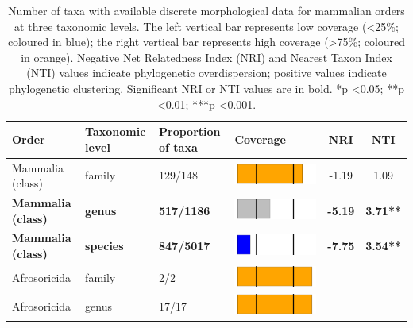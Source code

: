 \begin{longtable}{lL{1.8cm}C{2cm}lcc}
\caption{Number of taxa with available discrete morphological data for mammalian orders at three
taxonomic levels. The left vertical bar represents low coverage (\textless 25\%; coloured in blue); the right vertical bar represents high coverage (\textgreater 75\%; coloured in orange). Negative Net Relatedness Index (NRI) and Nearest Taxon Index (NTI) values indicate phylogenetic overdispersion; positive values indicate phylogenetic clustering. Significant NRI or NTI values are in bold. *p \textless 0.05; **p \textless 0.01; ***p \textless 0.001.
} \\ 

  \hline
Order & Taxonomic level & Proportion of taxa & Coverage & NRI & NTI \\ 
  \hline
  Mammalia (class) & family & 129/148 & \includegraphics[width=0.20\linewidth, height=0.05\linewidth]{Table_figures/bar40.pdf} & -1.19 & 1.09 \\ 
  \textbf{Mammalia (class)} & \textbf{genus} & \textbf{517/1186} & \includegraphics[width=0.20\linewidth, height=0.05\linewidth]{Table_figures/bar41.pdf} & \textbf{-5.19} & \textbf{3.71**} \\ 
  \textbf{Mammalia (class)} & \textbf{species} & \textbf{847/5017} & \includegraphics[width=0.20\linewidth, height=0.05\linewidth]{Table_figures/bar42.pdf} & \textbf{-7.75} & \textbf{3.54**} \\ 
  Afrosoricida & family & 2/2 & \includegraphics[width=0.20\linewidth, height=0.05\linewidth]{Table_figures/bar1.pdf} &   &   \\ 
  Afrosoricida & genus & 17/17 & \includegraphics[width=0.20\linewidth, height=0.05\linewidth]{Table_figures/bar2.pdf} &   &   \\ 

\end{longtable}
